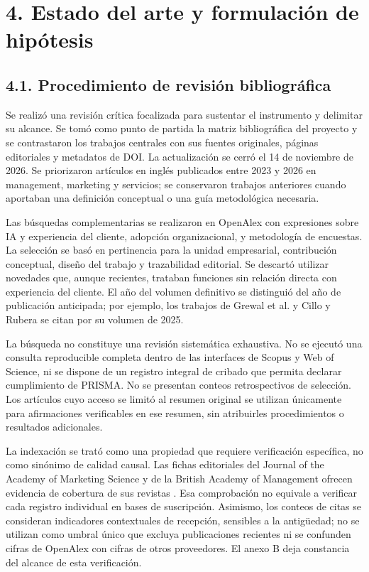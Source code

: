 \documentclass[12pt,letterpaper]{article}
\begin{document}
\section*{4. Estado del arte y formulación de hipótesis}
\subsection*{4.1. Procedimiento de revisión bibliográfica}
Se realizó una revisión crítica focalizada para sustentar el instrumento y delimitar su alcance. Se tomó como punto de partida la matriz bibliográfica del proyecto y se contrastaron los trabajos centrales con sus fuentes originales, páginas editoriales y metadatos de DOI. La actualización se cerró el 14 de noviembre de 2026. Se priorizaron artículos en inglés publicados entre 2023 y 2026 en management, marketing y servicios; se conservaron trabajos anteriores cuando aportaban una definición conceptual o una guía metodológica necesaria.

Las búsquedas complementarias se realizaron en OpenAlex con expresiones sobre IA y experiencia del cliente, adopción organizacional, y metodología de encuestas. La selección se basó en pertinencia para la unidad empresarial, contribución conceptual, diseño del trabajo y trazabilidad editorial. Se descartó utilizar novedades que, aunque recientes, trataban funciones sin relación directa con experiencia del cliente. El año del volumen definitivo se distinguió del año de publicación anticipada; por ejemplo, los trabajos de Grewal et al. y Cillo y Rubera se citan por su volumen de 2025.

La búsqueda no constituye una revisión sistemática exhaustiva. No se ejecutó una consulta reproducible completa dentro de las interfaces de Scopus y Web of Science, ni se dispone de un registro integral de cribado que permita declarar cumplimiento de PRISMA. No se presentan conteos retrospectivos de selección. Los artículos cuyo acceso se limitó al resumen original se utilizan únicamente para afirmaciones verificables en ese resumen, sin atribuirles procedimientos o resultados adicionales.

La indexación se trató como una propiedad que requiere verificación específica, no como sinónimo de calidad causal. Las fichas editoriales del Journal of the Academy of Marketing Science y de la British Academy of Management ofrecen evidencia de cobertura de sus revistas \citep{bjm,jams}. Esa comprobación no equivale a verificar cada registro individual en bases de suscripción. Asimismo, los conteos de citas se consideran indicadores contextuales de recepción, sensibles a la antigüedad; no se utilizan como umbral único que excluya publicaciones recientes ni se confunden cifras de OpenAlex con cifras de otros proveedores. El anexo B deja constancia del alcance de esta verificación.
\end{document}
